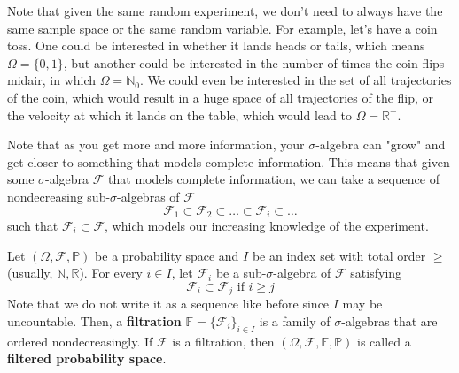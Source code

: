     Note that given the same random experiment, we don't need to always have the same sample space or the same random variable. For example, let's have a coin toss. One could be interested in whether it lands heads or tails, which means $\Omega = \{0, 1\}$, but another could be interested in the number of times the coin flips midair, in which $\Omega = \mathbb{N}_0$. We could even be interested in the set of all trajectories of the coin, which would result in a huge space of all trajectories of the flip, or the velocity at which it lands on the table, which would lead to $\Omega = \mathbb{R}^+$. 

    Note that as you get more and more information, your $\sigma$-algebra can "grow" and get closer to something that models complete information. This means that given some $\sigma$-algebra $\mathcal{F}$ that models complete information, we can take a sequence of nondecreasing sub-$\sigma$-algebras of $\mathcal{F}$ 
    \begin{equation}
      \mathcal{F}_1 \subset \mathcal{F}_2 \subset \ldots \subset \mathcal{F}_i \subset \ldots
    \end{equation}
    such that $\mathcal{F}_i \subset \mathcal{F}$, which models our increasing knowledge of the experiment. 

    \begin{definition}[Filtration]
      Let $(\Omega, \mathcal{F}, \mathbb{P})$ be a probability space and $I$ be an index set with total order $\geq$ (usually, $\mathbb{N}, \mathbb{R}$). For every $i \in I$, let $\mathcal{F}_i$ be a sub-$\sigma$-algebra of $\mathcal{F}$ satisfying 
      \begin{equation}
        \mathcal{F}_i \subset \mathcal{F}_j \text{ if } i \geq j
      \end{equation}
      Note that we do not write it as a sequence like before since $I$ may be uncountable. Then, a \textbf{filtration} $\mathbb{F} = \{\mathcal{F}_i\}_{i \in I}$ is a family of $\sigma$-algebras that are ordered nondecreasingly. If $\mathcal{F}$ is a filtration, then $(\Omega, \mathcal{F}, \mathbb{F}, \mathbb{P})$ is called a \textbf{filtered probability space}. 
    \end{definition}

